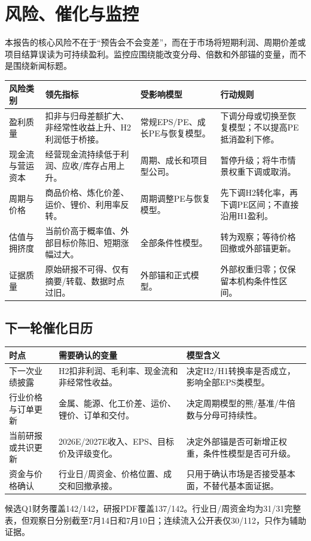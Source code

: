 \chapter{风险、催化与监控}

本报告的核心风险不在于“预告会不会变差”，而在于市场将短期利润、周期价差或项目结算误读为可持续盈利。监控应围绕能改变分母、倍数和外部锚的变量，而不是围绕新闻标题。

\noindent
\begin{exhibitbox}
\small
\begin{tabularx}{\textwidth}{L{2.2cm}L{4.0cm}L{4.4cm}X}
\toprule
\textbf{风险类别} & \textbf{领先指标} & \textbf{受影响模型} & \textbf{行动规则} \\
\midrule
盈利质量 & 扣非与归母差额扩大、非经常性收益上升、H2利润低于桥接。 & 常规EPS/PE、成长PE与恢复模型。 & 下调分母或切换至恢复模型；不以提高PE抵消盈利下修。 \\
现金流与营运资本 & 经营现金流持续低于利润、应收/库存占用上升。 & 周期、成长和项目型公司。 & 暂停升级；将牛市情景权重下调或取消。 \\
周期与价格 & 商品价格、炼化价差、运价、锂价、利用率反转。 & 周期调整PE与恢复模型。 & 先下调H2转化率，再下调PE区间；不直接沿用H1盈利。 \\
估值与拥挤度 & 当前价高于概率值、外部目标价陈旧、短期涨幅过大。 & 全部条件性模型。 & 转为观察；等待价格回撤或外部锚更新。 \\
证据质量 & 原始研报不可得、仅有摘要/转载、数据时点过旧。 & 外部锚和正式模型。 & 外部权重归零；仅保留本机构条件性区间。 \\
\bottomrule
\end{tabularx}
\normalsize
\end{exhibitbox}

\section{下一轮催化日历}

\noindent
\begin{tabularx}{\textwidth}{L{2.4cm}L{4.5cm}X}
\toprule
\textbf{时点} & \textbf{需要确认的变量} & \textbf{模型含义} \\
\midrule
下一次业绩披露 & H2扣非利润、毛利率、现金流和非经常性收益。 & 决定H2/H1转换率是否成立，影响全部EPS类模型。 \\
行业价格与订单更新 & 金属、能源、化工价差、运价、锂价、订单和交付。 & 决定周期模型的熊/基准/牛倍数与分母可持续性。 \\
当前研报或共识更新 & 2026E/2027E收入、EPS、目标价及评级变化。 & 决定外部锚是否可新增正权重，条件性模型是否可升级。 \\
资金与价格确认 & 行业日/周资金、价格位置、成交和回撤承接。 & 只用于确认市场是否接受基本面，不替代基本面证据。 \\
\bottomrule
\end{tabularx}

\noindent
\begin{sourcequalitybox}[数据边界]
候选Q1财务覆盖142/142，研报PDF覆盖137/142。行业日/周资金均为31/31完整表，但观察日分别截至7月14日和7月10日；连续流入公开表仅30/112，只作为辅助证据。
\end{sourcequalitybox}
